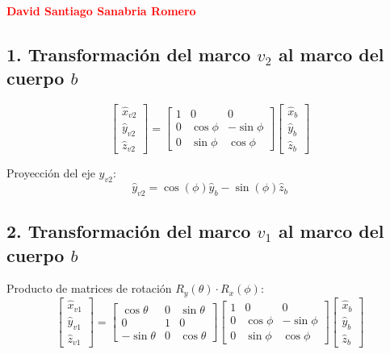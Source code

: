 \documentclass[11pt,a4paper]{article}
\begin{document}
\paragraph{\textcolor{red} {David Santiago Sanabria Romero}}
\subsection*{1. Transformación del marco $v_2$ al marco del cuerpo $b$}
\begin{equation}
\begin{bmatrix}
\hat{x}_{v2} \\
\hat{y}_{v2} \\
\hat{z}_{v2}
\end{bmatrix}
=
\begin{bmatrix}
1 & 0 & 0 \\
0 & \cos\phi & -\sin\phi \\
0 & \sin\phi & \cos\phi
\end{bmatrix}
\begin{bmatrix}
\hat{x}_b \\
\hat{y}_b \\
\hat{z}_b
\end{bmatrix}
\end{equation}

Proyección del eje $\hat{y}_{v2}$:
\begin{equation}
\hat{y}_{v2} = \cos(\phi)\hat{y}_b - \sin(\phi)\hat{z}_b
\end{equation}

\vspace{0.3cm}

\subsection*{2. Transformación del marco $v_1$ al marco del cuerpo $b$}

Producto de matrices de rotación $R_y(\theta) \cdot R_x(\phi)$:
\begin{equation}
\begin{bmatrix}
\hat{x}_{v1} \\
\hat{y}_{v1} \\
\hat{z}_{v1}
\end{bmatrix}
=
\begin{bmatrix}
\cos\theta & 0 & \sin\theta \\
0 & 1 & 0 \\
-\sin\theta & 0 & \cos\theta
\end{bmatrix}
\begin{bmatrix}
1 & 0 & 0 \\
0 & \cos\phi & -\sin\phi \\
0 & \sin\phi & \cos\phi
\end{bmatrix}
\begin{bmatrix}
\hat{x}_b \\
\hat{y}_b \\
\hat{z}_b
\end{bmatrix}
\end{equation}
\end{document}
